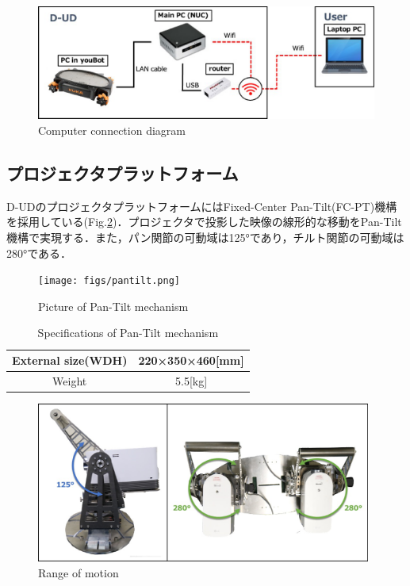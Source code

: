 \documentclass[12pt]{sonota/aislab}
\begin{document}
\begin{figure}[h]
\begin{center}
\includegraphics[clip, width=12cm]{figs/configuration.eps}
\caption{Computer connection diagram}
\label{computer_connection}
\end{center}
\end{figure}

\subsection{プロジェクタプラットフォーム}
D-UDのプロジェクタプラットフォームにはFixed-Center Pan-Tilt(FC-PT)機構を採用している(Fig.\ref{pantilt})\cite{pantilt}．プロジェクタで投影した映像の線形的な移動をPan-Tilt機構で実現する．また，パン関節の可動域は125°であり，チルト関節の可動域は280°である．

\begin{figure}[h]
\begin{center}
\texttt{[image: figs/pantilt.png]}
\caption{Picture of Pan-Tilt mechanism}
\label{pantilt}
\end{center}
\end{figure}

\begin{table}[h]
	\caption{Specifications of Pan-Tilt mechanism}
	\label{table:pantilt}
	\centering 
	\begin{tabular}[tbp]{|c|c|}
		\hline 
		External size(WDH) & 220×350×460[mm] \\\hline
		Weight & 5.5[kg] \\\hline
	\end{tabular}
\end{table}

\begin{figure}[h]
\begin{center}
\includegraphics[clip, width=11cm]{figs/angle_limit.eps}
\caption{Range of motion}
\label{pantilt_range_limit}
\end{center}
\end{figure}
\end{document}
